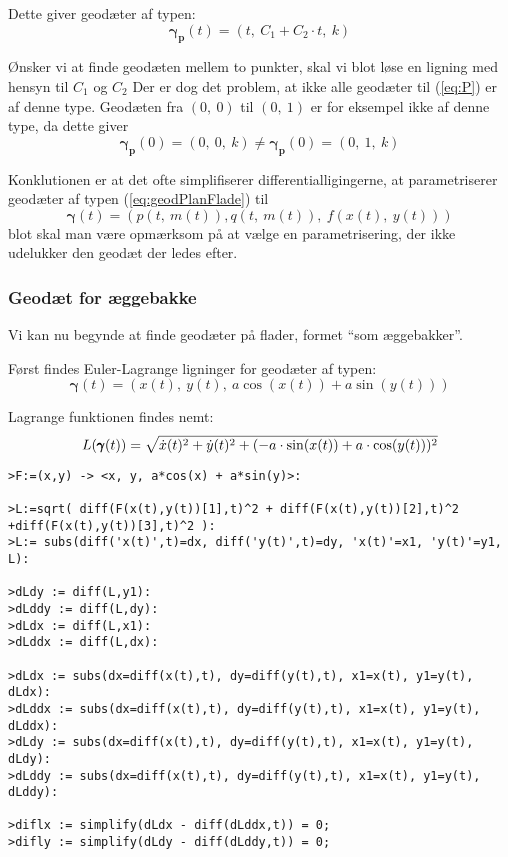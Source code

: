 Dette giver geodæter af typen:
\begin{equation*}
\pmb{\gamma_p}(t) = (t,~C_1 + C_2 \cdot t,~k)
\end{equation*}
 
 Ønsker vi at finde geodæten mellem to punkter, skal vi blot løse en ligning med hensyn til \(C_1\) og \(C_2\)
 Der er dog det problem, at ikke alle geodæter til (\ref{eq:P}) er af denne type.
 Geodæten fra \((0,~0)\) til \((0,~1)\) er for eksempel ikke af denne type, da dette giver
 \begin{equation*}
 \pmb{\gamma_p}(0) = (0,~0,~k) \neq  \pmb{\gamma_p}(0) = (0,~1,~k)
 \end{equation*}

Konklutionen er at det ofte simplifiserer differentialligingerne,
at parametriserer geodæter af typen (\ref{eq:geodPlanFlade}) til
\begin{equation*}
\pmb{\gamma}(t) = (p(t,~m(t)),q(t,~m(t)),~f(x(t),~y(t)))
\end{equation*}
blot skal man være opmærksom på at vælge en parametrisering, der ikke udelukker den geodæt der ledes efter.

\subsubsection{Geodæt for æggebakke }

Vi kan nu begynde at finde geodæter på flader, formet ``som æggebakker''.

Først findes Euler-Lagrange ligninger for geodæter af typen:
\begin{equation}\label{eq:aeggegeo}
\pmb{\gamma}(t) = (x(t),~y(t),~a\cos(x(t)) + a\sin(y(t)))
\end{equation}

Lagrange funktionen findes nemt:
\begin{equation*}
L(\pmb{\gamma}(t)) = \sqrt{\dot{x}(t)^2 + \dot{y}(t)^2 + ( -a \cdot \sin(x(t)) + a \cdot \cos(y(t)) )^2}
\end{equation*}
 
\begin{lstlisting}[caption=Udregning af de to Lagrange ligninger til (\ref{eq:aeggegeo}) med \emph{Maple}  ]
>F:=(x,y) -> <x, y, a*cos(x) + a*sin(y)>:

>L:=sqrt( diff(F(x(t),y(t))[1],t)^2 + diff(F(x(t),y(t))[2],t)^2 +diff(F(x(t),y(t))[3],t)^2 ):
>L:= subs(diff('x(t)',t)=dx, diff('y(t)',t)=dy, 'x(t)'=x1, 'y(t)'=y1, L):

>dLdy := diff(L,y1):
>dLddy := diff(L,dy):
>dLdx := diff(L,x1):
>dLddx := diff(L,dx):

>dLdx := subs(dx=diff(x(t),t), dy=diff(y(t),t), x1=x(t), y1=y(t), dLdx):
>dLddx := subs(dx=diff(x(t),t), dy=diff(y(t),t), x1=x(t), y1=y(t), dLddx):
>dLdy := subs(dx=diff(x(t),t), dy=diff(y(t),t), x1=x(t), y1=y(t), dLdy):
>dLddy := subs(dx=diff(x(t),t), dy=diff(y(t),t), x1=x(t), y1=y(t), dLddy):

>diflx := simplify(dLdx - diff(dLddx,t)) = 0;
>difly := simplify(dLdy - diff(dLddy,t)) = 0;
\end{lstlisting}

